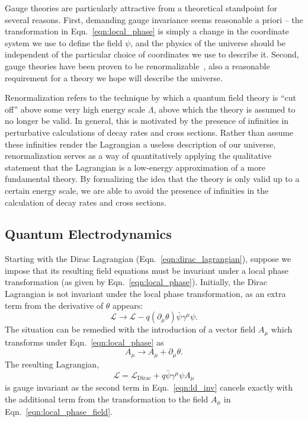 Gauge theories are particularly attractive from a theoretical standpoint for several reasons.
First, demanding gauge invariance seems reasonable a priori -- the transformation in Eqn.~\ref{eqn:local_phase} is simply a change in the coordinate system we use to define the field $\psi$, and the physics of the universe should be independent of the particular choice of coordinates we use to describe it.
Second, gauge theories have been proven to be renormalizable~\cite{tHooft:1971qjg}, also a reasonable requirement for a theory we hope will describe the universe.

Renormalization refers to the technique by which a quantum field theory is ``cut off'' above some very high energy scale $\Lambda$, above which the theory is assumed to no longer be valid.
In general, this is motivated by the presence of infinities in perturbative calculations of decay rates and cross sections.
Rather than assume these infinities render the Lagrangian a useless description of our universe, renormalization serves as a way of quantitatively applying the qualitative statement that the Lagrangian is a low-energy approximation of a more fundamental theory.
By formalizing the idea that the theory is only valid up to a certain energy scale, we are able to avoid the presence of infinities in the calculation of decay rates and cross sections.

\subsection{Quantum Electrodynamics} \label{sec:theory_qed}
Starting with the Dirac Lagrangian (Eqn.~\ref{eqn:dirac_lagrangian}), suppose we impose that its resulting field equations must be invariant under a local phase transformation (as given by Eqn.~\ref{eqn:local_phase}).
Initially, the Dirac Lagrangian is not invariant under the local phase transformation, as an extra term from the derivative of $\theta$ appears:
\begin{equation} \label{eqn:ld_var}
    \mathcal L \to \mathcal L - q (\partial_\mu \theta)\bar{\psi} \gamma^\mu \psi.
\end{equation}
The situation can be remedied with the introduction of a vector field $A_\mu$ which transforms under Eqn.~\ref{eqn:local_phase} as
\begin{equation} \label{eqn:local_phase_field}
    A_\mu \to A_\mu + \partial_\mu \theta.
\end{equation}
The resulting Lagrangian,
\begin{equation} \label{eqn:ld_inv}
    \mathcal L = \mathcal L_{\text{Dirac}} + q \bar{\psi} \gamma^\mu \psi A_\mu
\end{equation}
is gauge invariant as the second term in Eqn.~\ref{eqn:ld_inv} cancels exactly with the additional term from the transformation to the field $A_\mu$ in Eqn.~\ref{eqn:local_phase_field}.


